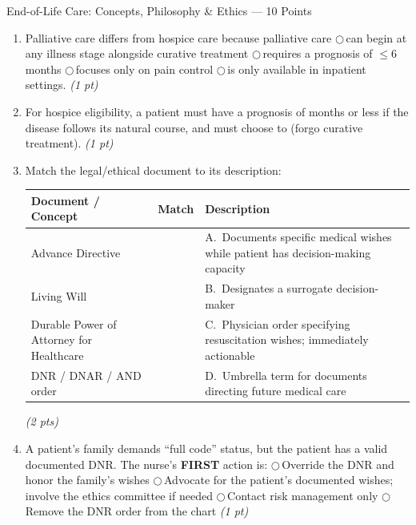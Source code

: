 \documentclass[11pt,letterpaper]{article}
\newcommand{\blank}[1][3cm]{\underline{\hspace{#1}}}
\begin{document}
\begin{diagbox}{End-of-Life Care: Concepts, Philosophy \& Ethics --- 10 Points}

\begin{enumerate}[leftmargin=1.5em, label=\textbf{\arabic*.},start=141]

  \item Palliative care differs from hospice care because palliative care
        $\bigcirc$\,can begin at any illness stage alongside curative treatment
        $\bigcirc$\,requires a prognosis of $\leq$6 months
        $\bigcirc$\,focuses only on pain control
        $\bigcirc$\,is only available in inpatient settings.
        \hfill\textit{(1 pt)}

  \item For hospice eligibility, a patient must have a prognosis of
        \blank[2cm] months or less if the disease follows its natural course,
        and must choose to \blank[5cm] (forgo curative treatment).
        \hfill\textit{(1 pt)}

  \item Match the legal/ethical document to its description:

  \vspace{0.2cm}
  \begin{center}
  \renewcommand{\arraystretch}{1.7}
  \begin{tabular}{|p{4.5cm}|p{1.5cm}|p{5.5cm}|}
  \hline
  \textbf{Document / Concept} & \textbf{Match} & \textbf{Description} \\
  \hline
  Advance Directive             & \blank[1.2cm] & A.\ Documents specific medical wishes while patient has decision-making capacity \\
  \hline
  Living Will                   & \blank[1.2cm] & B.\ Designates a surrogate decision-maker \\
  \hline
  Durable Power of Attorney for Healthcare & \blank[1.2cm] & C.\ Physician order specifying resuscitation wishes; immediately actionable \\
  \hline
  DNR / DNAR / AND order        & \blank[1.2cm] & D.\ Umbrella term for documents directing future medical care \\
  \hline
  \end{tabular}
  \end{center}
  \hfill\textit{(2 pts)}

  \item A patient's family demands ``full code'' status, but the patient has a valid
        documented DNR.  The nurse's \textbf{FIRST} action is:
        $\bigcirc$\,Override the DNR and honor the family's wishes
        $\bigcirc$\,Advocate for the patient's documented wishes; involve the ethics committee if needed
        $\bigcirc$\,Contact risk management only
        $\bigcirc$\,Remove the DNR order from the chart
        \hfill\textit{(1 pt)}


\end{enumerate}
\end{diagbox}
\end{document}
